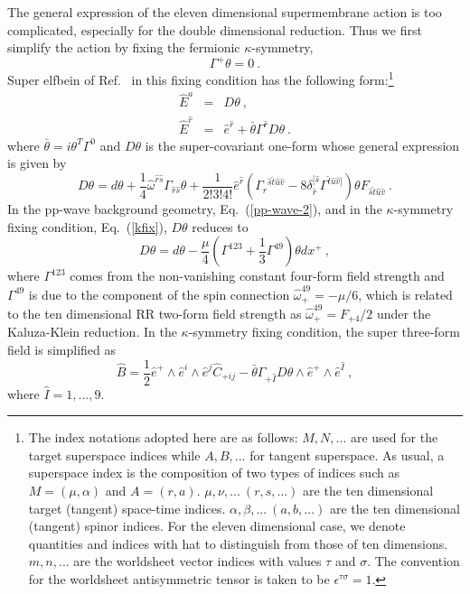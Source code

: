 \documentclass[a4paper,12pt]{article}
\begin{document}
The general expression of the eleven dimensional supermembrane action
is too complicated, especially for the double dimensional
reduction. Thus we first simplify the action by fixing the fermionic
$\kappa$-symmetry,
\begin{equation}
\Gamma^+ \theta = 0~.
\label{kfix}
\end{equation}
Super elfbein of Ref.~\cite{dew209} in this fixing condition has the
following form:\footnote{The index notations adopted here are as
follows: $M,N,...$ are used for the target superspace indices while
$A,B,...$ for tangent superspace. As usual, a superspace index is the
composition of two types of indices such as $M=(\mu,\alpha)$ and
$A=(r,a)$. $\mu,\nu,...~(r,s,...)$ are the ten dimensional target
(tangent) space-time indices.  $\alpha,\beta,...~(a,b,...)$ are the
ten dimensional (tangent) spinor indices.  For the eleven dimensional
case, we denote quantities and indices with hat to distinguish from
those of ten dimensions.  $m,n,...$ are the worldsheet vector indices
with values $\tau$ and $\sigma$. The convention for the worldsheet
antisymmetric tensor is taken to be $\epsilon^{\tau\sigma}=1$.}
\begin{eqnarray}
\hat{E}^a &=& D \theta ~,   \nonumber \\
\hat{E}^{\hat{r}} &=& \hat{e}^{\hat{r}} 
        + \bar{\theta} \Gamma^{\hat{r}} D \theta~.
\end{eqnarray}
where $\bar{\theta} = i \theta^T \Gamma^0$ and $D \theta$ is the
super-covariant one-form whose general expression is given by
\begin{equation}
D \theta = d \theta 
        + \frac{1}{4} \hat{\omega}^{\hat{r}\hat{s}}
                \Gamma_{\hat{r}\hat{s}} \theta
        + \frac{1}{2! 3! 4!} \hat{e}^{\hat{r}} 
        ( \Gamma_{\hat{r}}{}^{\hat{s}\hat{t}\hat{u}\hat{v}}
         -8 \delta_{\hat{r}}^{[ \hat{s}}
            \Gamma^{\hat{t}\hat{u}\hat{v}]} ) \theta
        F_{\hat{s}\hat{t}\hat{u}\hat{v}}~.
\end{equation}
In the pp-wave background geometry, Eq.~(\ref{pp-wave-2}), and in the
$\kappa$-symmetry fixing condition, Eq.~(\ref{kfix}), $D\theta$
reduces to
\begin{equation}
D \theta = d \theta 
  - \frac{\mu}{4} 
    \left( \Gamma^{123} + \frac{1}{3} \Gamma^{49} \right)
    \theta dx^+ ~,
\end{equation}
where $\Gamma^{123}$ comes from the non-vanishing constant four-form
field strength and $\Gamma^{49}$ is due to the component of the spin
connection $\hat{\omega}^{49}_+ = -\mu / 6$, which is related to the
ten dimensional RR two-form field strength as $\hat{\omega}^{49}_+ =
F_{+4}/2$ under the Kaluza-Klein reduction.  In the $\kappa$-symmetry
fixing condition, the super three-form field is simplified as
\begin{equation}
\hat{B}
   = \frac{1}{2} \hat{e}^+ \wedge \hat{e}^i \wedge \hat{e}^j
        \hat{C}_{+ij}
   - \bar{\theta} \Gamma_{+\hat{I}} D \theta \wedge \hat{e}^+
        \wedge \hat{e}^{\hat I} ~,
\label{3f}
\end{equation}
where ${\hat I} = 1,...,9$.
\end{document}
